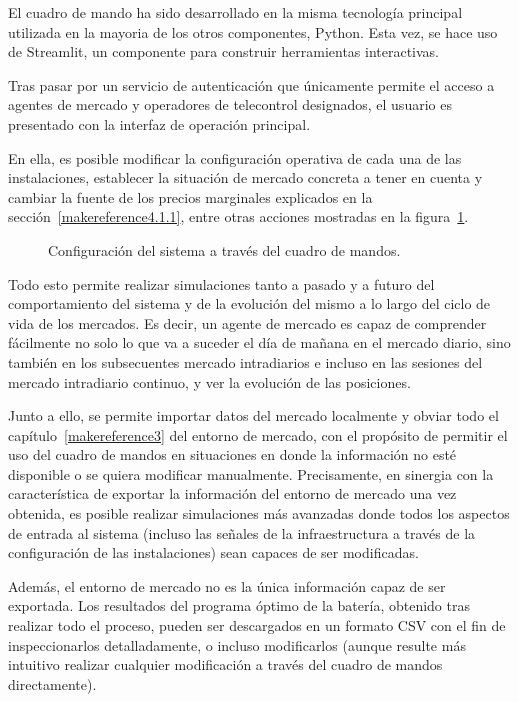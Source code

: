 El cuadro de mando ha sido desarrollado en la misma tecnología principal utilizada en la mayoria de los otros componentes, Python. Esta vez, se hace uso de Streamlit, un componente para construir herramientas interactivas.

Tras pasar por un servicio de autenticación que únicamente permite el acceso a agentes de mercado y operadores de telecontrol designados, el usuario es presentado con la interfaz de operación principal.

En ella, es posible modificar la configuración operativa de cada una de las instalaciones, establecer la situación de mercado concreta a tener en cuenta y cambiar la fuente de los precios marginales explicados en la sección~\ref{makereference4.1.1}, entre otras acciones mostradas en la figura~\ref{fig:configuración-sistema}.

\begin{figure}
  \centering
  \caption{Configuración del sistema a través del cuadro de mandos.}
  \label{fig:configuración-sistema}
\end{figure}

Todo esto permite realizar simulaciones tanto a pasado y a futuro del comportamiento del sistema y de la evolución del mismo a lo largo del ciclo de vida de los mercados. Es decir, un agente de mercado es capaz de comprender fácilmente no solo lo que va a suceder el día de mañana en el mercado diario, sino también en los subsecuentes mercado intradiarios e incluso en las sesiones del mercado intradiario continuo, y ver la evolución de las posiciones.

Junto a ello, se permite importar datos del mercado localmente y obviar todo el capítulo~\ref{makereference3} del entorno de mercado, con el propósito de permitir el uso del cuadro de mandos en situaciones en donde la información no esté disponible o se quiera modificar manualmente. Precisamente, en sinergia con la característica de exportar la información del entorno de mercado una vez obtenida, es posible realizar simulaciones más avanzadas donde todos los aspectos de entrada al sistema (incluso las señales de la infraestructura a través de la configuración de las instalaciones) sean capaces de ser modificadas.

Además, el entorno de mercado no es la única información capaz de ser exportada. Los resultados del programa óptimo de la batería, obtenido tras realizar todo el proceso, pueden ser descargados en un formato CSV con el fin de inspeccionarlos detalladamente, o incluso modificarlos (aunque resulte más intuitivo realizar cualquier modificación a través del cuadro de mandos directamente).

